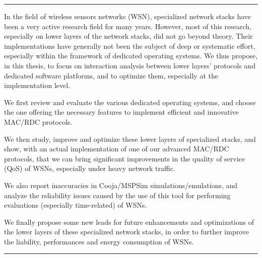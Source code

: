 \documentclass[11pt,a4paper,twoside]{thesul}
\begin{document}
\begin{ThesisAbstract}
\begin{FrenchAbstract}
  \end{FrenchAbstract}

 \hrule

  \begin{EnglishAbstract}

  In the field of wireless sensors networks (WSN), specialized network 
  stacks have been a very active research field for many years.
  However, most of this research, especially on lower layers of the network
  stacks, did not go beyond theory. Their implementations have generally not
  been the subject of deep or systematic effort, especially within the
  framework of dedicated operating systems. We thus propose, in this
  thesis, to focus on interaction analysis between lower layers' protocols
  and dedicated software platforms, and to optimize them, especially at
  the implementation level.

  We first review and evaluate the various dedicated operating
  systems, and choose the one offering the necessary features
  to implement efficient and innovative MAC/RDC protocols.

  We then study, improve and optimize these lower layers of specialized
  stacks, and show, with an actual implementation of one of our advanced
  MAC/RDC protocols, that we can bring significant improvements in the
  quality of service (QoS) of WSNs, especially under heavy network traffic.

  We also report inaccuracies in Cooja/MSPSim simulations/emulations,
  and analyze the reliability issues caused by the use of this tool for
  performing evaluations (especially time-related) of WSNs.

  We finally propose some new leads for future enhancements and
  optimizations of the lower layers of these specialized network stacks,
  in order to further improve the liability, performances and energy
  consumption of WSNs.


  \end{EnglishAbstract}

 \hrule

\end{ThesisAbstract}




\end{document}
